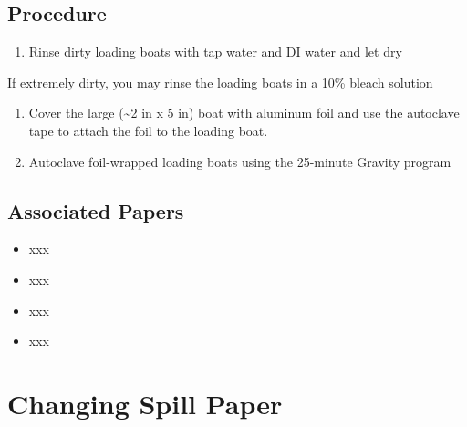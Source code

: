 \documentclass[
  letterpaper,
  DIV=11,
  numbers=noendperiod]{scrreprt}
\providecommand{\tightlist}{%
  \setlength{\itemsep}{0pt}\setlength{\parskip}{0pt}}\usepackage{longtable,booktabs,array}
\begin{document}
\hypertarget{procedure-5}{%
\section{Procedure}\label{procedure-5}}

\begin{enumerate}
\def\labelenumi{\arabic{enumi}.}
\tightlist
\item
  Rinse dirty loading boats with tap water and DI water and let dry
\end{enumerate}

\begin{tcolorbox}[enhanced jigsaw, rightrule=.15mm, title=\textcolor{quarto-callout-note-color}{\faInfo}\hspace{0.5em}{NOTE}, titlerule=0mm, opacitybacktitle=0.6, toprule=.15mm, bottomrule=.15mm, opacityback=0, left=2mm, colframe=quarto-callout-note-color-frame, breakable, coltitle=black, colback=white, colbacktitle=quarto-callout-note-color!10!white, bottomtitle=1mm, leftrule=.75mm, toptitle=1mm, arc=.35mm]

If extremely dirty, you may rinse the loading boats in a 10\% bleach
solution

\end{tcolorbox}

\begin{enumerate}
\def\labelenumi{\arabic{enumi}.}
\setcounter{enumi}{1}
\tightlist
\item
  Cover the large (\textasciitilde2 in x 5 in) boat with aluminum foil
  and use the autoclave tape to attach the foil to the loading boat.
\item
  Autoclave foil-wrapped loading boats using the 25-minute Gravity
  program
\end{enumerate}

\hypertarget{associated-papers-5}{%
\section{Associated Papers}\label{associated-papers-5}}

\begin{itemize}
\tightlist
\item
  xxx
\item
  xxx
\item
  xxx
\item
  xxx
\end{itemize}

\hypertarget{sec-general-spill_paper}{%
\chapter{Changing Spill Paper}\label{sec-general-spill_paper}}
\end{document}
